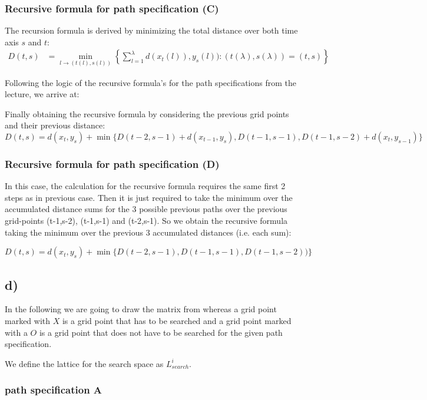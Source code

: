 \subsubsection*{Recursive formula for path specification (C)}
\label{subsub:ci}
The recursion formula is derived by minimizing the total distance over both time axis $s$ and $t$:
\begin{align}
    D(t,s) &= \min_{l\to (t(l),s(l))}\left\{\sum_{l=1}^{\lambda}d(x_t(l)),y_s(l)) : (t(\lambda),s(\lambda)) = (t,s)\right\}
\end{align}

Following the logic of the recursive formula's for the path specifications from the lecture, we arrive at: 

Finally obtaining the recursive formula by considering the previous grid points and their previous distance:
\[
D(t,s) = d(x_t,y_s) + \min \{ D(t-2,s-1) + d(x_{t-1},y_s), D(t-1,s-1), D(t-1,s-2) + d(x_t,y_{s-1}) \}
\]


\subsubsection*{Recursive formula for path specification (D)}
\label{subsub:cii}

In this case, the calculation for the recursive formula requires the same first 2 steps as in previous case. Then it is just required to take the minimum over the accumulated distance sums for the 3 possible previous paths over the previous grid-points (t-1,s-2), (t-1,s-1) and (t-2,s-1). So we obtain the recursive formula taking the minimum over the previous 3 accumulated distances (i.e. each sum):

\[
D(t,s) = d(x_t,y_s) + \min \{ D(t-2,s-1), D(t-1,s-1), D(t-1,s-2)) \}
\]



\subsection*{d)} %
\label{sub:d}

In the following we are going to draw the matrix from whereas a grid point marked with $X$ is a grid point that has to be searched 
and a grid point marked with a $O$ is a grid point that does not have to be searched for the given path specification. 

We define the lattice for the search space as $L_{search}^i$.

\subsubsection*{path specification A} %
\label{ssub:path_specification_a}

